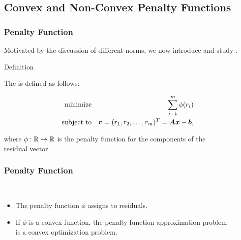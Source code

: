 \subsection{Convex and Non-Convex Penalty Functions}

\begin{frame}
  \frametitle{Penalty Function}

  Motivated by the discussion of different norms, we now introduce and study .
  \spread

  \begin{citeblock}{Definition}
	  
    The  is defined as follows:

    \begin{eqnarray*}
      \mbox{minimize}   & &\sum_{i=1}^m \phi(r_i) \\
      \mbox{subject to} & & {\bm r}= (r_1, r_2, \dots, r_m)^T = {\bm A}{\bm x} -{\bm b},
    \end{eqnarray*}
    
    where $\phi:\mathbb{R} \rightarrow \mathbb{R}$ is the penalty function for the components of the \\
    residual vector.
  \end{citeblock}
 \end{frame}
 
 
\begin{frame}
  \frametitle{Penalty Function \cont}

   \\[.5cm]
  
  \begin{itemize}
    \item The penalty function $\phi$ assigns  to residuals. \\[.5cm]
    \item If $\phi$ is a convex function, the penalty function approximation problem \\
      is a convex optimization problem.
  \end{itemize}
\end{frame}


